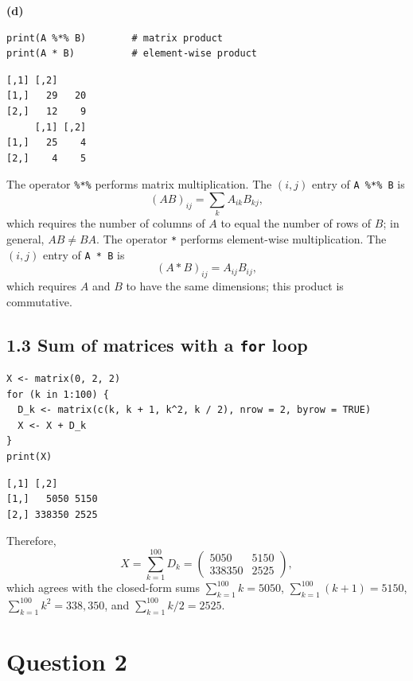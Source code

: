 \documentclass{HW} %
\begin{document}
\medskip
\noindent\textbf{(d)}

\begin{lstlisting}
print(A %*% B)        # matrix product
print(A * B)          # element-wise product
\end{lstlisting}
\begin{lstlisting}[style=routput]
     [,1] [,2]
[1,]   29   20
[2,]   12    9
     [,1] [,2]
[1,]   25    4
[2,]    4    5
\end{lstlisting}
The operator \texttt{\%*\%} performs matrix multiplication. The $(i,j)$ entry of \texttt{A \%*\% B} is
\[ (AB)_{ij} = \sum_{k} A_{ik} B_{kj}, \]
which requires the number of columns of $A$ to equal the number of rows of $B$; in general, $AB \neq BA$. The operator \texttt{*} performs element-wise multiplication. The $(i,j)$ entry of \texttt{A * B} is
\[ (A * B)_{ij} = A_{ij} B_{ij}, \]
which requires $A$ and $B$ to have the same dimensions; this product is commutative.

\subsection*{1.3 Sum of matrices with a \texttt{for} loop}
\begin{lstlisting}
X <- matrix(0, 2, 2)
for (k in 1:100) {
  D_k <- matrix(c(k, k + 1, k^2, k / 2), nrow = 2, byrow = TRUE)
  X <- X + D_k
}
print(X)
\end{lstlisting}
\begin{lstlisting}[style=routput]
       [,1] [,2]
[1,]   5050 5150
[2,] 338350 2525
\end{lstlisting}
Therefore,
\[ X = \sum_{k=1}^{100} D_k = \begin{pmatrix} 5050 & 5150 \\ 338350 & 2525 \end{pmatrix}, \]
which agrees with the closed-form sums $\sum_{k=1}^{100} k = 5050$, $\sum_{k=1}^{100} (k+1) = 5150$, $\sum_{k=1}^{100} k^2 = 338{,}350$, and $\sum_{k=1}^{100} k/2 = 2525$.

\section*{Question 2}
\end{document}
